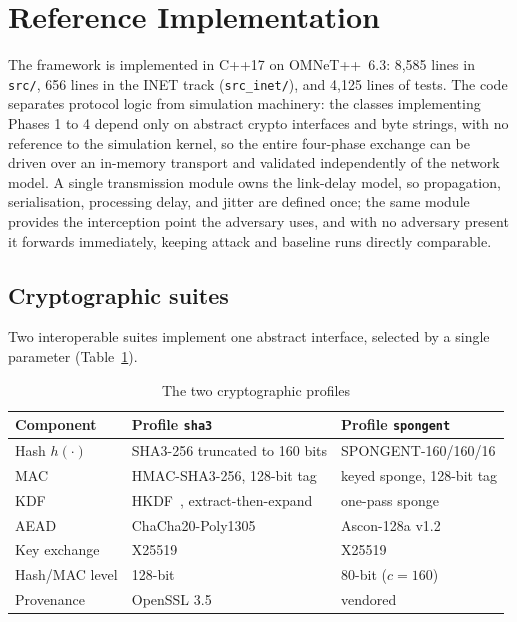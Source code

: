 \documentclass[journal]{IEEEtran}
\begin{document}
\section{Reference Implementation}
\label{sec:impl}

The framework is implemented in C++17 on OMNeT++~6.3: 8{,}585 lines in
\texttt{src/}, 656 lines in the INET track (\texttt{src\_inet/}), and 4{,}125
lines of tests. The code separates protocol logic from simulation machinery:
the classes implementing Phases 1 to 4 depend only on abstract crypto
interfaces and byte strings, with no reference to the simulation kernel, so the
entire four-phase exchange can be driven over an in-memory transport and
validated independently of the network model. A single transmission module owns
the link-delay model, so propagation, serialisation, processing delay, and
jitter are defined once; the same module provides the interception point the
adversary uses, and with no adversary present it forwards immediately, keeping
attack and baseline runs directly comparable.

\subsection{Cryptographic suites}

Two interoperable suites implement one abstract interface, selected by a single
parameter (Table~\ref{tab:suites}).

\begin{table}[H]
\centering
\caption{The two cryptographic profiles}
\label{tab:suites}
\scriptsize
\setlength{\tabcolsep}{2.2pt}
\begin{tabular}{@{}p{1.75cm}p{3.3cm}p{3.3cm}@{}}
\toprule
\textbf{Component} & \textbf{Profile \texttt{sha3}} & \textbf{Profile \texttt{spongent}} \\
\midrule
Hash $h(\cdot)$ & SHA3-256 truncated to 160 bits & SPONGENT-160/160/16 \\
MAC & HMAC-SHA3-256, 128-bit tag & keyed sponge, 128-bit tag \\
KDF & HKDF~\cite{hkdf}, extract-then-expand & one-pass sponge \\
AEAD & ChaCha20-Poly1305 & Ascon-128a v1.2~\cite{ascon} \\
Key exchange & X25519~\cite{curve25519} & X25519 \\
Hash/MAC level & 128-bit & 80-bit ($c=160$) \\
Provenance & OpenSSL 3.5 & vendored \\
\bottomrule
\end{tabular}
\end{table}
\end{document}
